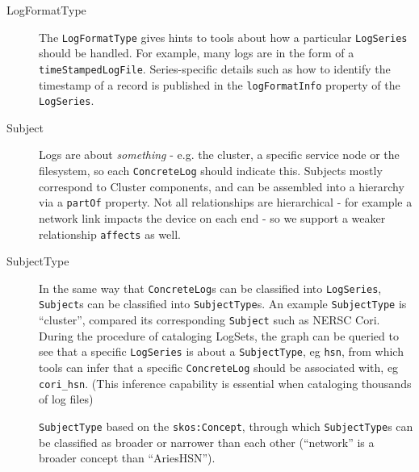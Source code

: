 \begin{description}
\item[LogFormatType] \hfill

The \texttt{LogFormatType} gives hints to tools about how a particular
\texttt{LogSeries} should be handled. For example, many logs are in the
form of a \texttt{timeStampedLogFile}. Series-specific details such 
as how to identify the timestamp of a record is published in the 
\texttt{logFormatInfo} property of the \texttt{LogSeries}.
 
\item[Subject] \hfill

Logs are about \emph{something} - e.g. the cluster, a specific service
node or the filesystem, so each \texttt{ConcreteLog} should indicate
this. Subjects mostly correspond to Cluster components, and can be 
assembled into a hierarchy via a \texttt{partOf} property. Not all 
relationships are hierarchical - for example a network link impacts
the device on each end - so we support a weaker relationship 
\texttt{affects} as well.

\item[SubjectType] \hfill

In the same way that \texttt{ConcreteLog}s can be classified into 
\texttt{LogSeries}, \texttt{Subject}s can be classified into 
\texttt{SubjectType}s. An example \texttt{SubjectType} is ``cluster'',
compared its corresponding \texttt{Subject} such as NERSC Cori. During the
procedure of cataloging LogSets, the graph can be queried to see that
a specific \texttt{LogSeries} is about a \texttt{SubjectType}, eg 
\texttt{hsn}, from which tools can infer that a specific 
\texttt{ConcreteLog} should be associated with, eg \texttt{cori\_hsn}.
(This inference capability is essential when cataloging thousands of 
log files)

\texttt{SubjectType} based on the \texttt{skos:Concept}, through 
which \texttt{SubjectType}s can be classified as broader or narrower
than each other (``network'' is a broader concept than ``AriesHSN'').

\end{description}







